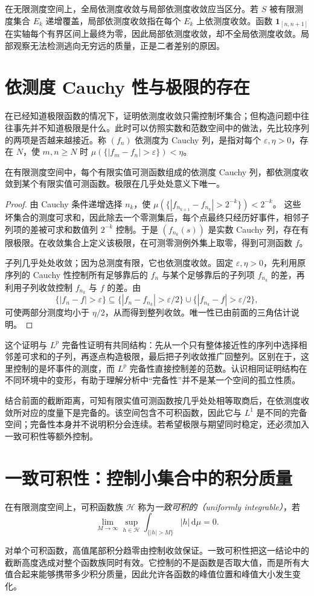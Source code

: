 在无限测度空间上，全局依测度收敛与局部依测度收敛应当区分。若 $S$ 被有限测度集合 $E_k$ 递增覆盖，局部依测度收敛指在每个 $E_k$ 上依测度收敛。函数 $\mathbf1_{[n,n+1]}$ 在实轴每个有界区间上最终为零，因此局部依测度收敛，却不全局依测度收敛。局部观察无法检测逃向无穷远的质量，正是二者差别的原因。

\section{依测度 Cauchy 性与极限的存在}
在已经知道极限函数的情况下，证明依测度收敛只需控制坏集合；但构造问题中往往事先并不知道极限是什么。此时可以仿照实数和范数空间中的做法，先比较序列的两项是否越来越接近。称 $(f_n)$ 依测度为 Cauchy 列，是指对每个 $\varepsilon,\eta>0$，存在 $N$，使 $m,n\geq N$ 时
$\mu(\{|f_m-f_n|>\varepsilon\})<\eta$。

\begin{proposition}
在有限测度空间中，每个有限实值可测函数组成的依测度 Cauchy 列，都依测度收敛到某个有限实值可测函数。极限在几乎处处意义下唯一。
\end{proposition}
\begin{proof}
由 Cauchy 条件递增选择 $n_k$，使
$\mu(\{|f_{n_{k+1}}-f_{n_k}|>2^{-k}\})<2^{-k}$。
这些坏集合的测度可求和，因此除去一个零测集后，每个点最终只经历好事件，相邻子列项的差被可求和数值列 $2^{-k}$ 控制。于是 $(f_{n_k}(s))$ 是实数 Cauchy 列，存在有限极限。在收敛集合上定义该极限，在可测零测例外集上取零，得到可测函数 $f$。

子列几乎处处收敛；因为总测度有限，它也依测度收敛。固定 $\varepsilon,\eta>0$，先利用原序列的 Cauchy 性控制所有足够靠后的 $f_n$ 与某个足够靠后的子列项 $f_{n_k}$ 的差，再利用子列收敛控制 $f_{n_k}$ 与 $f$ 的差。由
\[
 \{|f_n-f|>\varepsilon\}\subseteq
 \{|f_n-f_{n_k}|>\varepsilon/2\}
 \cup\{|f_{n_k}-f|>\varepsilon/2\},
\]
可使两部分测度均小于 $\eta/2$，从而得到整列收敛。唯一性已由前面的三角估计说明。
\end{proof}
这个证明与 $L^p$ 完备性证明有共同结构：先从一个只有整体接近性的序列中选择相邻差可求和的子列，再逐点构造极限，最后把子列收敛推广回整列。区别在于，这里控制的是坏事件的测度，而 $L^p$ 完备性直接控制差的范数。认识相同证明结构在不同环境中的变形，有助于理解分析中“完备性”并不是某一个空间的孤立性质。

结合前面的截断距离，可知有限实值可测函数按几乎处处相等取商后，在依测度收敛所对应的度量下是完备的。该空间包含不可积函数，因此它与 $L^1$ 是不同的完备空间；完备性本身并不说明积分会连续。若希望极限与期望同时稳定，还必须加入一致可积性等额外控制。

\section{一致可积性：控制小集合中的积分质量}
\begin{definition}
在有限测度空间上，可积函数族 $\mathcal H$ 称为\emph{一致可积的（uniformly integrable）}，若
\[
 \lim_{M\to\infty}\sup_{h\in\mathcal H}
 \int_{\{|h|>M\}}|h|\,\mathrm d\mu=0.
\]
\label{def:mt-uniform-integrability}
\end{definition}
对单个可积函数，高值尾部积分趋零由控制收敛保证。一致可积性把这一结论中的截断高度选成对整个函数族同时有效。它控制的不是函数是否取大值，而是所有大值合起来能够携带多少积分质量，因此允许各函数的峰值位置和峰值大小发生变化。

